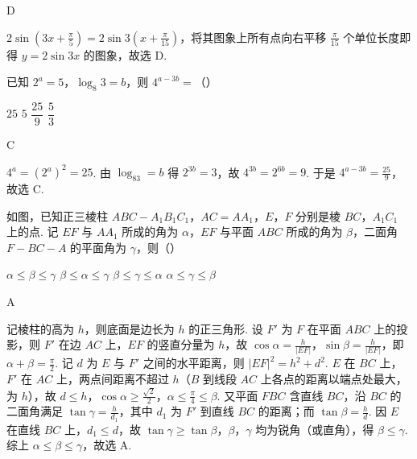 \begin{answer}
D
\end{answer}

\begin{solution}
\(2\sin\left(3x+\frac\pi5\right)=2\sin3\left(x+\frac\pi{15}\right)\)，将其图象上所有点向右平移 \(\frac\pi{15}\) 个单位长度即得 \(y=2\sin3x\) 的图象，故选 D.
\end{solution}

\begin{problem}
已知 \(2^a=5\)，\(\log_8 3=b\)，则 \(4^{a-3b}=\)（\quad）

\choices
    {\(25\)}
    {\(5\)}
    {\(\dfrac{25}{9}\)}
    {\(\dfrac{5}{3}\)}
\end{problem}

\begin{answer}
C
\end{answer}

\begin{solution}
\(4^a=(2^a)^2=25\). 由 \(\log_83=b\) 得 \(2^{3b}=3\)，故 \(4^{3b}=2^{6b}=9\). 于是 \(4^{a-3b}=\frac{25}9\)，故选 C.
\end{solution}

\begin{problem}
如图，已知正三棱柱 \(ABC-A_1B_1C_1\)，\(AC=AA_1\)，\(E\)，\(F\) 分别是棱 \(BC\)，\(A_1C_1\) 上的点. 记 \(EF\) 与 \(AA_1\) 所成的角为 \(\alpha\)，\(EF\) 与平面 \(ABC\) 所成的角为 \(\beta\)，二面角 \(F-BC-A\) 的平面角为 \(\gamma\)，则（\quad）


\choices
    {\(\alpha\le \beta\le \gamma\)}
    {\(\beta\le \alpha\le \gamma\)}
    {\(\beta\le \gamma\le \alpha\)}
    {\(\alpha\le \gamma\le \beta\)}
\end{problem}

\begin{answer}
A
\end{answer}

\begin{solution}
记棱柱的高为 \(h\)，则底面是边长为 \(h\) 的正三角形. 设 \(F'\) 为 \(F\) 在平面 \(ABC\) 上的投影，则 \(F'\) 在边 \(AC\) 上，\(EF\) 的竖直分量为 \(h\)，故 \(\cos\alpha=\frac{h}{|EF|}\)，\(\sin\beta=\frac{h}{|EF|}\)，即 \(\alpha+\beta=\frac\pi2\). 记 \(d\) 为 \(E\) 与 \(F'\) 之间的水平距离，则 \(|EF|^2=h^2+d^2\). \(E\) 在 \(BC\) 上，\(F'\) 在 \(AC\) 上，两点间距离不超过 \(h\)（\(B\) 到线段 \(AC\) 上各点的距离以端点处最大，为 \(h\)），故 \(d\le h\)，\(\cos\alpha\ge\frac{\sqrt2}2\)，\(\alpha\le\frac\pi4\le\beta\). 又平面 \(FBC\) 含直线 \(BC\)，沿 \(BC\) 的二面角满足 \(\tan\gamma=\frac{h}{d_1}\)，其中 \(d_1\) 为 \(F'\) 到直线 \(BC\) 的距离；而 \(\tan\beta=\frac{h}{d}\). 因 \(E\) 在直线 \(BC\) 上，\(d_1\le d\)，故 \(\tan\gamma\ge\tan\beta\)，\(\beta\)，\(\gamma\) 均为锐角（或直角），得 \(\beta\le\gamma\). 综上 \(\alpha\le\beta\le\gamma\)，故选 A.
\end{solution}

